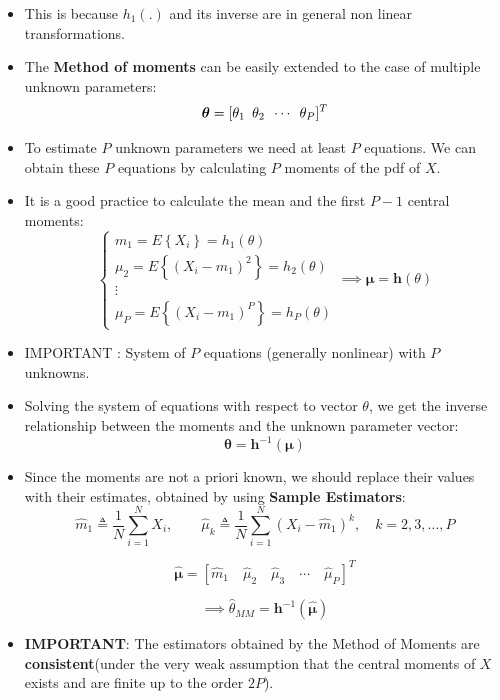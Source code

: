 \begin{itemize}
    \item This is because \(h_1(.)\) and its inverse are in general non linear transformations.
    \item The \textbf{Method of moments} can be easily extended to the case of multiple unknown parameters:
    \[
    \boldsymbol{\theta}=[\theta_1\hspace{0.5em} \theta_2\hspace{0.5em}\cdots\hspace{0.5em}\theta_P]^T
    \]
    \item To estimate \(P\) unknown parameters we need at least \(P\) equations. We can obtain these \(P\) equations by calculating \(P\) moments of the pdf of \(X\).
    \item It is a good practice to calculate the mean and the first \(P-1\) central moments:
$$
\begin{cases}
    m_1 = E\left\{ X_i \right\} = h_1(\theta) \\
    \mu_2 = E\left\{ (X_i - m_1)^2 \right\} = h_2(\theta) \\
    \vdots \\
    \mu_P = E\left\{ (X_i - m_1)^P \right\} = h_P(\theta)
\end{cases}
\implies \boldsymbol{\mu} = \mathbf{h}(\theta)
$$

    \item IMPORTANT : System of \(P\) equations (generally nonlinear) with \(P\) unknowns.

    \item Solving the system of equations with respect to vector \(\theta\), we get the inverse relationship between the moments and the unknown parameter vector:
    \[
    \boldsymbol{\theta}=\textbf{h}^{-1}(\boldsymbol{\mu})
    \]
    \item Since the moments are not a priori known, we should replace their values with their estimates, obtained by using \textbf{Sample Estimators}:
$$
\hat{m}_1 \triangleq \frac{1}{N} \sum_{i=1}^N X_i, \qquad
\hat{\mu}_k \triangleq \frac{1}{N} \sum_{i=1}^N \left( X_i - \hat{m}_1 \right)^k, \quad k = 2,3,\ldots,P
$$

$$
\hat{\boldsymbol{\mu}} = \left[ \hat{m}_1 \quad \hat{\mu}_2 \quad \hat{\mu}_3 \quad \cdots \quad \hat{\mu}_P \right]^T
$$

$$
\implies \hat{\theta}_{MM} = \mathbf{h}^{-1}(\hat{\boldsymbol{\mu}})
$$


    \item \textbf{IMPORTANT}: The estimators obtained by the Method of Moments are \textbf{consistent}(under the very weak assumption that the central moments of \(X\) exists and are finite up to the order \(2P\)).


\end{itemize}
